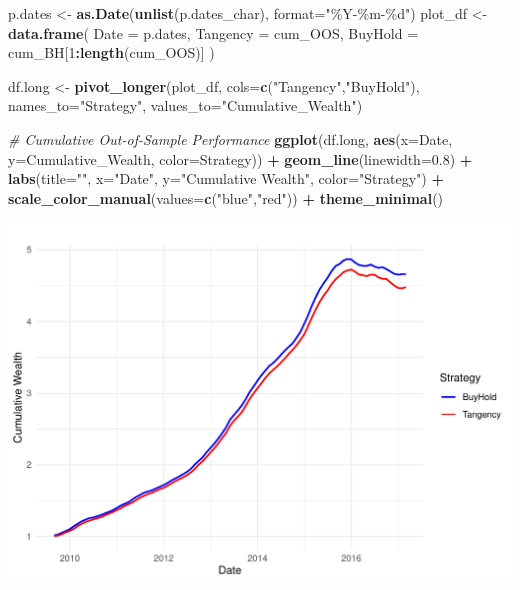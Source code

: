 \documentclass[
  12pt,
]{article}
\newenvironment{Shaded}{\begin{snugshade}}{\end{snugshade}}
\newcommand{\AttributeTok}[1]{\textcolor[rgb]{0.13,0.29,0.53}{#1}}
\newcommand{\CommentTok}[1]{\textcolor[rgb]{0.56,0.35,0.01}{\textit{#1}}}
\newcommand{\DecValTok}[1]{\textcolor[rgb]{0.00,0.00,0.81}{#1}}
\newcommand{\FloatTok}[1]{\textcolor[rgb]{0.00,0.00,0.81}{#1}}
\newcommand{\FunctionTok}[1]{\textcolor[rgb]{0.13,0.29,0.53}{\textbf{#1}}}
\newcommand{\NormalTok}[1]{#1}
\newcommand{\OtherTok}[1]{\textcolor[rgb]{0.56,0.35,0.01}{#1}}
\newcommand{\SpecialCharTok}[1]{\textcolor[rgb]{0.81,0.36,0.00}{\textbf{#1}}}
\newcommand{\StringTok}[1]{\textcolor[rgb]{0.31,0.60,0.02}{#1}}
\begin{document}
\begin{Shaded}
\begin{Highlighting}[]
\NormalTok{p.dates }\OtherTok{\textless{}{-}} \FunctionTok{as.Date}\NormalTok{(}\FunctionTok{unlist}\NormalTok{(p.dates\_char), }\AttributeTok{format=}\StringTok{"\%Y{-}\%m{-}\%d"}\NormalTok{) }
\NormalTok{plot\_df }\OtherTok{\textless{}{-}} \FunctionTok{data.frame}\NormalTok{(}
  \AttributeTok{Date     =}\NormalTok{ p.dates,}
  \AttributeTok{Tangency =}\NormalTok{ cum\_OOS,}
  \AttributeTok{BuyHold  =}\NormalTok{ cum\_BH[}\DecValTok{1}\SpecialCharTok{:}\FunctionTok{length}\NormalTok{(cum\_OOS)]}
\NormalTok{)}

\NormalTok{df.long }\OtherTok{\textless{}{-}} \FunctionTok{pivot\_longer}\NormalTok{(plot\_df, }\AttributeTok{cols=}\FunctionTok{c}\NormalTok{(}\StringTok{"Tangency"}\NormalTok{,}\StringTok{"BuyHold"}\NormalTok{),}
                             \AttributeTok{names\_to=}\StringTok{"Strategy"}\NormalTok{, }\AttributeTok{values\_to=}\StringTok{"Cumulative\_Wealth"}\NormalTok{)}

\CommentTok{\# Cumulative Out{-}of{-}Sample Performance}
\FunctionTok{ggplot}\NormalTok{(df.long, }\FunctionTok{aes}\NormalTok{(}\AttributeTok{x=}\NormalTok{Date, }\AttributeTok{y=}\NormalTok{Cumulative\_Wealth, }\AttributeTok{color=}\NormalTok{Strategy)) }\SpecialCharTok{+}
  \FunctionTok{geom\_line}\NormalTok{(}\AttributeTok{linewidth=}\FloatTok{0.8}\NormalTok{) }\SpecialCharTok{+}
  \FunctionTok{labs}\NormalTok{(}\AttributeTok{title=}\StringTok{""}\NormalTok{,}
       \AttributeTok{x=}\StringTok{"Date"}\NormalTok{, }\AttributeTok{y=}\StringTok{"Cumulative Wealth"}\NormalTok{, }\AttributeTok{color=}\StringTok{"Strategy"}\NormalTok{) }\SpecialCharTok{+}
  \FunctionTok{scale\_color\_manual}\NormalTok{(}\AttributeTok{values=}\FunctionTok{c}\NormalTok{(}\StringTok{"blue"}\NormalTok{,}\StringTok{"red"}\NormalTok{)) }\SpecialCharTok{+}
  \FunctionTok{theme\_minimal}\NormalTok{()}
\end{Highlighting}
\end{Shaded}

\includegraphics{NDXNES005_A1_RMD_files/figure-latex/unnamed-chunk-21-1.pdf}
\end{document}
